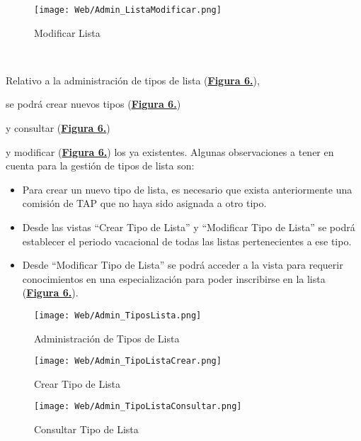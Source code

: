 \begin{figure}[!p]
  \centering
  \texttt{[image: Web/Admin\_ListaModificar.png]}
  \caption{Modificar Lista}
  \label{fig:Web_Admin_ListaModificar}
\end{figure}
\FloatBarrier

\newpage~
\addtocounter{figura_manual}{1} Relativo a la administración de tipos de lista (\textbf{\hyperref[fig:Web_Admin_TiposLista]{Figura 6.}}),\addtocounter{figura_manual}{1} se podrá crear nuevos tipos (\textbf{\hyperref[fig:Web_Admin_TipoListaCrear]{Figura 6.}})\addtocounter{figura_manual}{1} y consultar (\textbf{\hyperref[fig:Web_Admin_TipoListaConsultar]{Figura 6.}})\addtocounter{figura_manual}{1} y modificar (\textbf{\hyperref[fig:Web_Admin_TipoListaModificar]{Figura 6.}}) los ya existentes. Algunas observaciones a tener en cuenta para la gestión de tipos de lista son:
\begin{itemize}
  \item \addtocounter{figura_manual}{1} Para crear un nuevo tipo de lista, es necesario que exista anteriormente una comisión de TAP que no haya sido asignada a otro tipo.
  \item Desde las vistas ``Crear Tipo de Lista'' y ``Modificar Tipo de Lista'' se podrá establecer el periodo vacacional de todas las listas pertenecientes a ese tipo.
  \item Desde ``Modificar Tipo de Lista'' se podrá acceder a la vista para requerir conocimientos en una especialización para poder inscribirse en la lista (\textbf{\hyperref[fig:Web_Admin_TipoListaRequerirEspecializacion]{Figura 6.}}).
\end{itemize}

\begin{figure}[!htbp]
  \centering
  \texttt{[image: Web/Admin\_TiposLista.png]}
  \caption{Administración de Tipos de Lista}
  \label{fig:Web_Admin_TiposLista}
\end{figure}
\FloatBarrier

\begin{figure}[!htbp]
  \centering
  \texttt{[image: Web/Admin\_TipoListaCrear.png]}
  \caption{Crear Tipo de Lista}
  \label{fig:Web_Admin_TipoListaCrear}
\end{figure}
\FloatBarrier

\begin{figure}[!htbp]
  \centering
  \texttt{[image: Web/Admin\_TipoListaConsultar.png]}
  \caption{Consultar Tipo de Lista}
  \label{fig:Web_Admin_TipoListaConsultar}
\end{figure}
\FloatBarrier

